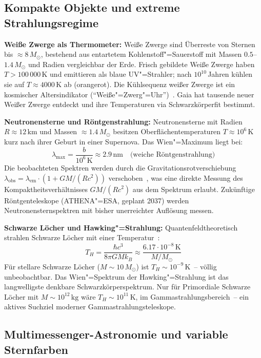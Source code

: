 ﻿\documentclass[a4paper,12pt]{article}
\theoremstyle{definition}
\begin{document}
\subsection{Kompakte Objekte und extreme Strahlungsregime}

\textbf{Weiße Zwerge als Thermometer:}
Weiße Zwerge sind Überreste von Sternen bis $\approx 8\,M_\odot$,
bestehend aus entartetem Kohlenstoff"=Sauerstoff mit Massen
$0.5$--$1.4\,M_\odot$ und Radien vergleichbar der Erde.
Frisch gebildete Weiße Zwerge haben $T > 100\,000\,\text{K}$
und emittieren als blaue UV"=Strahler; nach $10^{10}$\,Jahren
kühlen sie auf $T \approx 4000\,\text{K}$ ab (orangerot).
Die Kühlsequenz weißer Zwerge ist ein kosmischer Altersindikator
(``Weiße"=Zwerg"=Uhr'')~\cite{fontaine2001}. Gaia hat tausende neuer
Weißer Zwerge entdeckt und ihre Temperaturen via Schwarzkörperfit
bestimmt.

\textbf{Neutronensterne und Röntgenstrahlung:}
Neutronensterne mit Radien $R \approx 12\,\text{km}$ und Massen
$\approx 1.4\,M_\odot$ besitzen Oberflächentemperaturen
$T \approx 10^6\,\text{K}$ kurz nach ihrer Geburt in einer Supernova.
Das Wien"=Maximum liegt bei:
\[
    \lambda_{\max} = \frac{b}{10^6\,\text{K}} \approx 2.9\,\text{nm}
    \quad \text{(weiche Röntgenstrahlung)}
\]
Die beobachteten Spektren werden durch die Gravitationsrotverschiebung
$\lambda_{\text{obs}} = \lambda_{\text{em}} \cdot (1 + GM/(Rc^2))$
verschoben~\cite{lattimer2012}, was eine direkte Messung des
Kompaktheitsverhältnisses $GM/(Rc^2)$ aus dem Spektrum erlaubt.
Zukünftige Röntgenteleskope (ATHENA"=ESA, geplant 2037) werden
Neutronensternspektren mit bisher unerreichter Auflösung messen.

\textbf{Schwarze Löcher und Hawking"=Strahlung:}
Quantenfeldtheoretisch strahlen Schwarze Löcher mit einer
Temperatur~\cite{hawking1975}:
\[
    T_H = \frac{\hbar c^3}{8\pi G M k_B}
    \approx \frac{6.17 \cdot 10^{-8}\,\text{K}}{M/M_\odot}
\]
Für stellare Schwarze Löcher ($M \sim 10\,M_\odot$) ist $T_H \sim 10^{-9}\,\text{K}$~--
völlig unbeobachtbar. Das Wien"=Spektrum der Hawking"=Strahlung ist das
langwelligste denkbare Schwarzkörperspektrum. Nur für Primordiale
Schwarze Löcher mit $M \sim 10^{12}\,\text{kg}$ wäre $T_H \sim 10^{11}\,\text{K}$,
im Gammastrahlungsbereich~-- ein aktives Suchziel moderner Gammastrahlungsteleskope.

\subsection{Multimessenger-Astronomie und variable Sternfarben}
\end{document}
